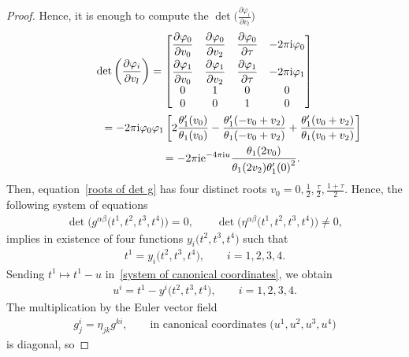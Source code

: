 \documentclass[pdftex]{sigma}%
\numberwithin{equation}{section}
\begin{document}
\begin{proof}
Hence, it is enough to compute the $\det\big(\frac{\partial\varphi_i}{\partial v_l}\big)$
\begin{gather}
\det\left(\frac{\partial\varphi_i}{\partial v_l} \right)=
\begin{bmatrix}
 \dfrac{\partial\varphi_0}{\partial v_0} & \dfrac{\partial\varphi_0}{\partial v_2} & \dfrac{\partial\varphi_0}{\partial \tau}&-2\pi {\rm i}\varphi_0 \vspace{1mm}\\
 \dfrac{\partial\varphi_1}{\partial v_0} & \dfrac{\partial\varphi_1}{\partial v_2} & \dfrac{\partial\varphi_1}{\partial \tau} &-2\pi {\rm i}\varphi_1 \\
 0& 1 &0 & 0 \\
 0& 0 & 1&0
\end{bmatrix}\nonumber
\\ \hphantom{\det\left(\frac{\partial\varphi_i}{\partial v_l} \right)}
{}=-2\pi {\rm i} \varphi_0\varphi_1\left[2\frac{\theta_1^{\prime}(v_0)}{\theta_1(v_0)} -\frac{\theta_1^{\prime}(-v_0+v_2)}{\theta_1(-v_0+v_2)} +\frac{\theta_1^{\prime}(v_0+v_2)}{\theta_1(v_0+v_2)} \right]\nonumber
\\ \hphantom{\det\left(\frac{\partial\varphi_i}{\partial v_l} \right)}
= -2\pi {\rm i} {\rm e}^{-4\pi {\rm i} u}\frac{\theta_1(2v_0)}{\theta_1(2v_2){\theta_1^{\prime}(0)}^2}.\label{roots of det g}
\end{gather}
Then, equation~\eqref{roots of det g} has four distinct roots $v_0=0,\frac{1}{2},\frac{\tau}{2},\frac{1+\tau}{2}$. Hence, the following system of equations
\begin{gather}\label{system of canonical coordinates}
\det \big( g^{\alpha\beta}\big(t^1,t^2,t^3,t^4\big)\big)=0,\qquad
\det \big(\eta^{\alpha\beta}\big(t^1,t^2,t^3,t^4\big)\big)\neq 0,
\end{gather}
implies in existence of four functions $y_i\big(t^2,t^3,t^4\big)$ such that
\begin{gather*}
t^1=y_i\big(t^2,t^3,t^4\big), \qquad i=1,2,3,4.
\end{gather*}
Sending $t^1\mapsto t^1-u$ in~\eqref{system of canonical coordinates}, we obtain
\begin{gather*}
u^i=t^1-y^i\big(t^2,t^3,t^4\big), \qquad i=1,2,3,4.
\end{gather*}
The multiplication by the Euler vector field
\begin{gather*}
g^{i}_j=\eta_{jk}g^{ki},\qquad \text{in canonical coordinates } \big(u^1,u^2,u^3,u^4\big)
\end{gather*}
 is diagonal, so

\end{proof}
\end{document}
